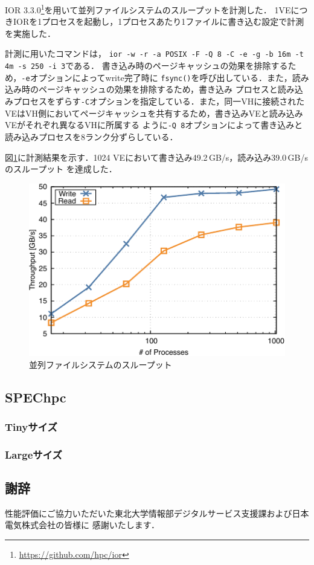 ﻿\documentclass[submit,techrep,noauthor]{ipsj}
\begin{document}
IOR 3.3.0\footnote{\url{https://github.com/hpc/ior}}を用いて並列ファイルシステムのスループットを計測した．
1VEにつきIORを1プロセスを起動し，1プロセスあたり1ファイルに書き込む設定で計測を実施した．

計測に用いたコマンドは，
\texttt{ior -w -r -a POSIX -F -Q 8 -C -e -g -b 16m -t 4m -s 250 -i 3}である．
書き込み時のページキャッシュの効果を排除するため，\texttt{-e}オプションによってwrite完了時に
\texttt{fsync()}を呼び出している．また，読み込み時のページキャッシュの効果を排除するため，書き込み
プロセスと読み込みプロセスをずらす\texttt{-C}オプションを指定している．また，同一VHに接続された
VEはVH側においてページキャッシュを共有するため，書き込みVEと読み込みVEがそれぞれ異なるVHに所属する
ように\texttt{-Q 8}オプションによって書き込みと読み込みプロセスを8ランク分ずらしている．

図\ref{fig:ior}に計測結果を示す．1024 VEにおいて書き込み49.2\,GB/s，読み込み39.0\,GB/sのスループット
を達成した．

\begin{figure}
  \centering
  \includegraphics{figs/ior.pdf}
  \caption{並列ファイルシステムのスループット}\label{fig:ior}
\end{figure}

\subsection{SPEChpc}

\subsubsection{Tinyサイズ}

\subsubsection{Largeサイズ}

\subsection*{謝辞}

性能評価にご協力いただいた東北大学情報部デジタルサービス支援課および日本電気株式会社の皆様に
感謝いたします．



\end{document}
